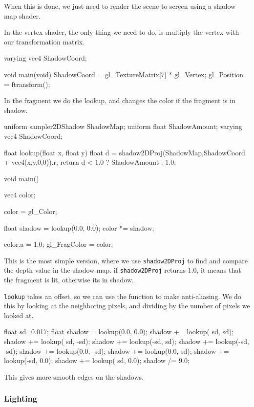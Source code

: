 When this is done, we just need to render the scene to screen using a
shadow map shader.

In the vertex shader, the only thing we need to do, is multiply the
vertex with our transformation matrix.

\begin{cppcode}
varying vec4 ShadowCoord;

void main(void) {
    ShadowCoord = gl_TextureMatrix[7] * gl_Vertex;
    gl_Position = ftransform();
}
\end{cppcode}

In the fragment we do the lookup, and changes the color if the
fragment is in shadow.

\begin{cppcode}  
uniform sampler2DShadow ShadowMap;
uniform float ShadowAmount;
varying vec4 ShadowCoord;

float lookup(float x, float y) {
    float d = shadow2DProj(ShadowMap,ShadowCoord + vec4(x,y,0,0)).r;
    return d < 1.0 ? ShadowAmount : 1.0;
}

void main() {
    vec4 color;

    color = gl_Color;

    float shadow = lookup(0.0, 0.0);
    color *= shadow;

    color.a = 1.0;
    gl_FragColor = color;
}

\end{cppcode}

This is the most simple version, where we use \texttt{shadow2DProj} to
find and compare the depth value in the shadow map. if
\texttt{shadow2DProj} returns 1.0, it means that the fragment is lit,
otherwise its in shadow.

\texttt{lookup} takes an offset, so we can use the function to make
anti-aliasing. We do this by looking at the neighboring pixels, and
dividing by the number of pixels we looked at.

\begin{cppcode}
    float sd=0.017;
    float shadow = lookup(0.0, 0.0);
    shadow += lookup( sd,  sd);
    shadow += lookup( sd, -sd);
    shadow += lookup(-sd,  sd);
    shadow += lookup(-sd, -sd);
    shadow += lookup(0.0, -sd);
    shadow += lookup(0.0,  sd);
    shadow += lookup(-sd, 0.0);
    shadow += lookup( sd, 0.0);
    shadow /= 9.0;
\end{cppcode}

This gives more smooth edges on the shadows.

\subsubsection*{Lighting}

